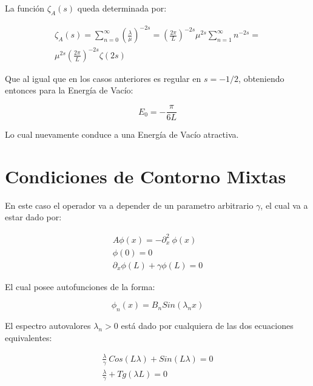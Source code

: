 La función $\zeta _A (s)$ queda determinada por:

\begin{equation}
\begin{array}{c}
\zeta _A (s) = 
\sum _{n=0} ^{\infty} \left( \frac{\lambda}{\mu} \right)^{-2s} =  
\left( \frac{2 \pi}{L} \right) ^{-2s} \mu ^{2s} \sum _{n=1} ^{\infty} n ^{-2s} =  \\
\mu ^{2s} \left( \frac{2 \pi}{L} \right) ^{-2s} \zeta (2s)
\end{array}
\end{equation}

Que al igual que en los casos anteriores es regular en $s=-1/2$, obteniendo entonces para la Energía de Vacío:

\begin{equation}
E _0 = - \frac{\pi}{6 L}
\end{equation}

Lo cual nuevamente conduce a una Energía de Vacío atractiva.

\section{Condiciones de Contorno Mixtas}

En este caso el operador va a depender de un parametro arbitrario $\gamma$, el cual va a estar dado por:

\begin{equation}
\begin{array}{c}
    A \phi (x) = - \partial ^2 _x \ \phi (x)  \\
    \phi (0) = 0 \\ 
    \partial _x \phi (L) + \gamma \phi (L) = 0
\end{array}
\end{equation}

El cual posee autofunciones de la forma:

\begin{equation}
\phi _n (x) = 
B _n Sin( \lambda _n x )
\end{equation}

El espectro autovalores $\lambda _n > 0 $ está dado por  cualquiera de las dos ecuaciones equivalentes: 

\begin{equation}
\begin{array}{cc}
    \frac{\lambda}{\gamma}  \ Cos( L \lambda ) +   Sin( L \lambda ) = 0 \\
    \frac{\lambda}{\gamma}  + Tg(\lambda L )  = 0 
\label{autovalores}
\end{array}
\end{equation}



